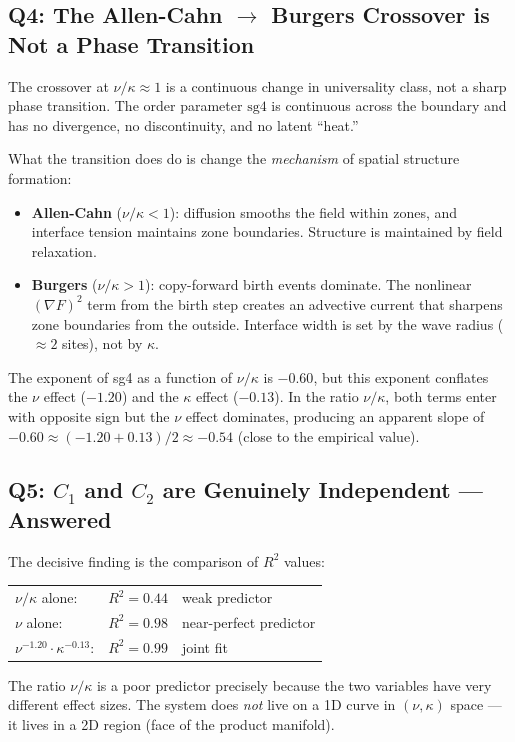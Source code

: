 \documentclass[11pt]{article}
\begin{document}
\subsection{Q4: The Allen-Cahn $\to$ Burgers Crossover is Not a Phase Transition}

The crossover at $\nu/\kappa \approx 1$ is a continuous change in universality class,
not a sharp phase transition. The order parameter $\mathrm{sg4}$ is continuous across
the boundary and has no divergence, no discontinuity, and no latent ``heat.''

What the transition does do is change the \emph{mechanism} of spatial structure formation:
\begin{itemize}
\item \textbf{Allen-Cahn} ($\nu/\kappa < 1$): diffusion smooths the field within zones,
  and interface tension maintains zone boundaries. Structure is maintained by field
  relaxation.
\item \textbf{Burgers} ($\nu/\kappa > 1$): copy-forward birth events dominate. The
  nonlinear $(\nabla F)^2$ term from the birth step creates an advective current that
  sharpens zone boundaries from the outside. Interface width is set by the wave radius
  ($\approx 2$ sites), not by $\kappa$.
\end{itemize}

The exponent of sg4 as a function of $\nu/\kappa$ is $-0.60$, but this exponent conflates
the $\nu$ effect ($-1.20$) and the $\kappa$ effect ($-0.13$). In the ratio $\nu/\kappa$,
both terms enter with opposite sign but the $\nu$ effect dominates, producing an apparent
slope of $-0.60 \approx (-1.20 + 0.13)/2 \approx -0.54$ (close to the empirical value).

\subsection{Q5: $C_1$ and $C_2$ are Genuinely Independent --- Answered}

The decisive finding is the comparison of $R^2$ values:
\begin{center}
\begin{tabular}{lcl}
$\nu/\kappa$ alone: & $R^2 = 0.44$ & weak predictor \\
$\nu$ alone: & $R^2 = 0.98$ & near-perfect predictor \\
$\nu^{-1.20} \cdot \kappa^{-0.13}$: & $R^2 = 0.99$ & joint fit \\
\end{tabular}
\end{center}
The ratio $\nu/\kappa$ is a poor predictor precisely because the two variables have
very different effect sizes. The system does \emph{not} live on a 1D curve in $(\nu, \kappa)$
space --- it lives in a 2D region (face of the product manifold).
\end{document}
